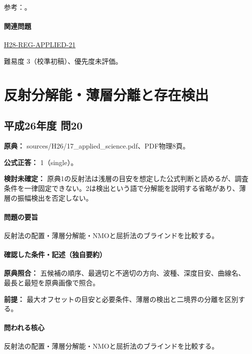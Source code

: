 \par 参考：\cite{epa_seismic_reflection,jica_refraction2015,usgs_processing2000}。

\paragraph{関連問題} \hyperref[q:h28-reg-applied-21]{H28-REG-APPLIED-21}

\par 難易度 3（校準初稿）、優先度未評価。

\section{反射分解能・薄層分離と存在検出}

\subsection{平成26年度 問20}
\label{q:h26-reg-applied-20}

\noindent\textbf{原典：} sources/H26/17\_applied\_science.pdf、PDF物理8頁。

\textbf{公式正答：} 1（single）。

\par\textbf{検討未確定：} 原典1の反射法は浅層の目安を想定した公式判断と読めるが、調査条件を一律固定できない。2は検出という語で分解能を説明する省略があり、薄層の振幅検出を否定しない。

\paragraph{問題の要旨} 反射法の配置・薄層分解能・NMOと屈折法のブラインドを比較する。

\paragraph{確認した条件・記述（独自要約）}\mbox{}\par

\noindent\textbf{原典照合：} 五候補の順序、最適切と不適切の方向、波種、深度目安、曲線名、最長と最短を原典画像で照合。\par

\noindent\textbf{前提：} 最大オフセットの目安と必要条件、薄層の検出と二境界の分離を区別する。\par

\paragraph{問われる核心} 反射法の配置・薄層分解能・NMOと屈折法のブラインドを比較する。

